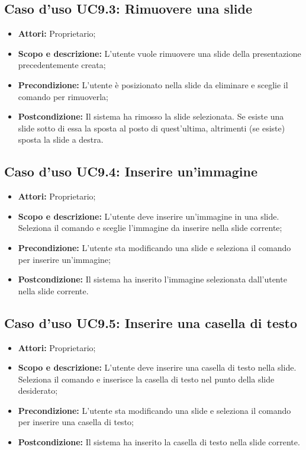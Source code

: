 \subsection{Caso d'uso UC9.3: Rimuovere una \gls{slide}}
\begin{itemize}
	\item \textbf{Attori:} Proprietario;
	\item \textbf{Scopo e descrizione:} L'utente vuole rimuovere una \gls{slide} della presentazione precedentemente creata;
	\item \textbf{Precondizione:} L'utente è posizionato nella \gls{slide} da eliminare e sceglie il comando per rimuoverla;
	\item \textbf{Postcondizione:} Il sistema ha rimosso la \gls{slide} selezionata. Se esiste una slide sotto di essa la sposta al posto di quest'ultima, altrimenti (se esiste) sposta la slide a destra.
\end{itemize}


\subsection{Caso d'uso UC9.4: Inserire un'immagine}
\begin{itemize}
\item \textbf{Attori:} Proprietario;
\item \textbf{Scopo e descrizione:} L'utente deve inserire un'immagine in una \gls{slide}. Seleziona il comando e sceglie l'immagine da inserire nella \gls{slide} corrente;
\item \textbf{Precondizione:} L'utente sta modificando una \gls{slide} e seleziona il comando per inserire un'immagine;
\item \textbf{Postcondizione:} Il sistema ha inserito l'immagine selezionata dall'utente nella \gls{slide} corrente.
\end{itemize}


\subsection{Caso d'uso UC9.5: Inserire una casella di testo}
\begin{itemize}
\item \textbf{Attori:} Proprietario;
\item \textbf{Scopo e descrizione:} L'utente deve inserire una casella di testo nella \gls{slide}. Seleziona il comando e inserisce la casella di testo nel punto della \gls{slide} desiderato;
\item \textbf{Precondizione:} L'utente sta modificando una \gls{slide} e seleziona il comando per inserire una casella di testo;
\item \textbf{Postcondizione:} Il sistema ha inserito la casella di testo nella \gls{slide} corrente.
\end{itemize}


